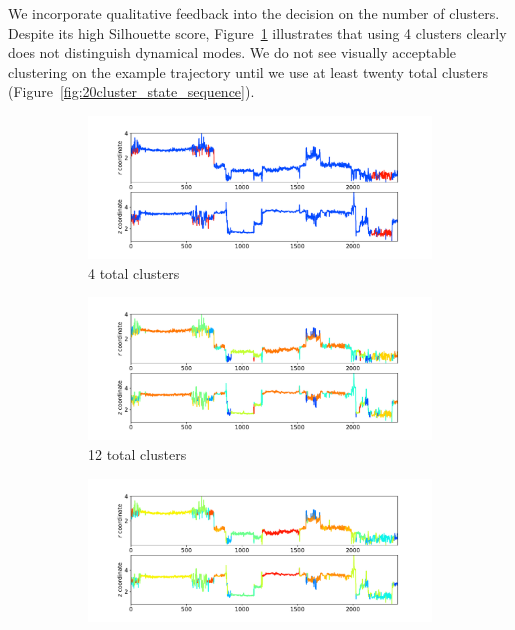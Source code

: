 \documentclass{article}
\begin{document}
  We incorporate qualitative feedback into the decision on the number of 
  clusters. Despite its high Silhouette score, Figure~\ref{fig:4cluster_state_sequence}
  illustrates that using 4 clusters clearly does not distinguish dynamical 
  modes. We do not see visually acceptable clustering on the example trajectory
  until we use at least twenty total clusters (Figure~\ref{fig:20cluster_state_sequence}).
  
  \begin{figure}
  \begin{subfigure}{0.9\textwidth}
  \includegraphics[width=1\textwidth]{clustered_traj_MET_ward_4.pdf}
  \caption{4 total clusters}\label{fig:4cluster_state_sequence}
  \end{subfigure}
  \begin{subfigure}{0.9\textwidth}
  \includegraphics[width=1\textwidth]{clustered_traj_MET_ward_12.pdf}
  \caption{12 total clusters}\label{fig:12cluster_state_sequence}
  \end{subfigure}
  \begin{subfigure}{0.9\textwidth}
  \includegraphics[width=1\textwidth]{clustered_traj_MET_ward_20.pdf}

\end{subfigure}
\end{figure}
\end{document}
